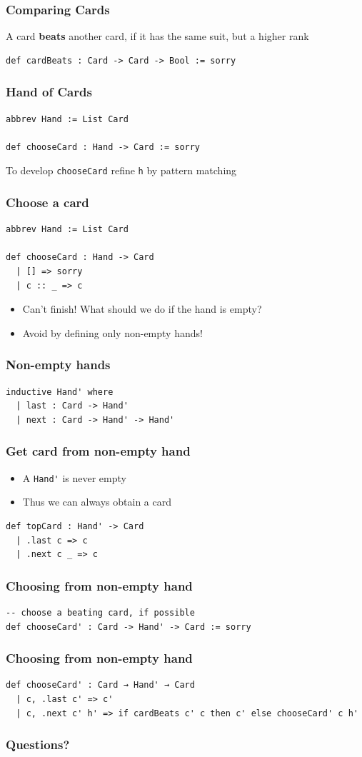 \documentclass{beamer}
\begin{document}
\begin{frame}[fragile]
  \frametitle{Comparing Cards}
  A card \textbf{beats} another card, if it has the same
  suit, but a higher rank
\begin{lstlisting}
def cardBeats : Card -> Card -> Bool := sorry
\end{lstlisting}
\end{frame}
\begin{frame}[fragile]
  \frametitle{Hand of Cards}
\begin{lstlisting}
abbrev Hand := List Card

def chooseCard : Hand -> Card := sorry
\end{lstlisting}
  To develop \texttt{chooseCard} refine \texttt{h} by pattern matching
\end{frame}
\begin{frame}[fragile]
  \frametitle{Choose a card}
\begin{lstlisting}
abbrev Hand := List Card

def chooseCard : Hand -> Card
  | [] => sorry
  | c :: _ => c
\end{lstlisting}
  \begin{itemize}
  \item Can't finish! What should we do if the hand is empty?
  \item Avoid by defining only non-empty hands!
  \end{itemize}
\end{frame}
\begin{frame}[fragile]
  \frametitle{Non-empty hands}
\begin{lstlisting}
inductive Hand' where
  | last : Card -> Hand'
  | next : Card -> Hand' -> Hand'
\end{lstlisting}
\end{frame}
\begin{frame}[fragile]
  \frametitle{Get card from non-empty hand}
  \begin{itemize}
  \item  A \lstinline{Hand'} is never empty
  \item  Thus we can always obtain a card
  \end{itemize}
\begin{lstlisting}
def topCard : Hand' -> Card
  | .last c => c
  | .next c _ => c
\end{lstlisting}
\end{frame}
\begin{frame}[fragile]
  \frametitle{Choosing from non-empty hand}
\begin{lstlisting}
-- choose a beating card, if possible
def chooseCard' : Card -> Hand' -> Card := sorry
\end{lstlisting}
\end{frame}
\begin{frame}[fragile]
  \frametitle{Choosing from non-empty hand}
\begin{lstlisting}
def chooseCard' : Card → Hand' → Card
  | c, .last c' => c'
  | c, .next c' h' => if cardBeats c' c then c' else chooseCard' c h'
\end{lstlisting}
\end{frame}

\begin{frame}
  \frametitle{Questions?}
  \begin{center}
  \end{center}
\end{frame}
\end{document}
